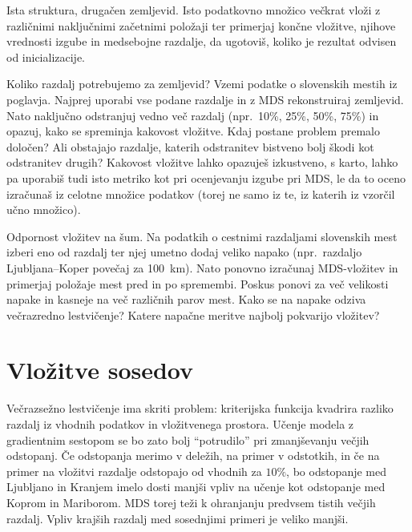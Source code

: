 \begin{exercise}{Ista struktura, drugačen zemljevid.}
Isto podatkovno množico večkrat vloži z različnimi naključnimi začetnimi položaji ter primerjaj končne vložitve, njihove vrednosti izgube in medsebojne razdalje, da ugotoviš, koliko je rezultat odvisen od inicializacije.
\end{exercise}

\begin{exercise}{Koliko razdalj potrebujemo za zemljevid?}
Vzemi podatke o slovenskih mestih iz poglavja. Najprej uporabi vse podane razdalje in z MDS rekonstruiraj zemljevid. Nato naključno odstranjuj vedno več razdalj (npr.\ 10\%, 25\%, 50\%, 75\%) in opazuj, kako se spreminja kakovost vložitve. Kdaj postane problem premalo določen? Ali obstajajo razdalje, katerih odstranitev bistveno bolj škodi kot odstranitev drugih? Kakovost vložitve lahko opazuješ izkustveno, s karto, lahko pa uporabiš tudi isto metriko kot pri ocenjevanju izgube pri MDS, le da to oceno izračunaš iz celotne množice podatkov (torej ne samo iz te, iz katerih iz vzorčil učno množico).
\end{exercise}

\begin{exercise}{Odpornost vložitev na šum.}
    Na podatkih o cestnimi razdaljami slovenskih mest izberi eno od razdalj ter njej umetno dodaj veliko napako (npr.\ razdaljo Ljubljana--Koper povečaj za 100~km). Nato ponovno izračunaj MDS-vložitev in primerjaj položaje mest pred in po spremembi. Poskus ponovi za več velikosti napake in kasneje na več različnih parov mest. Kako se na napake odziva večrazredno lestvičenje? Katere napačne meritve najbolj pokvarijo vložitev?
\end{exercise}
    

\section{Vložitve sosedov}

Večrazsežno lestvičenje ima skriti problem: kriterijska funkcija kvadrira razliko razdalj iz vhodnih podatkov in vložitvenega prostora. Učenje modela z gradientnim sestopom se bo zato bolj ``potrudilo'' pri zmanjševanju večjih odstopanj. Če odstopanja merimo v deležih, na primer v odstotkih, in če na primer na vložitvi razdalje odstopajo od vhodnih za $10\%$, bo odstopanje med Ljubljano in Kranjem imelo dosti manjši vpliv na učenje kot odstopanje med Koprom in Mariborom. MDS torej teži k ohranjanju predvsem tistih večjih razdalj. Vpliv krajših razdalj med sosednjimi primeri je veliko manjši.


